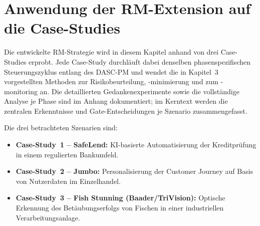 \section{Anwendung der RM-Extension auf die Case-Studies} \label{sec:analyseansatz}

Die entwickelte RM-Strategie wird in diesem Kapitel anhand von drei Case-Studies erprobt.
Jede Case-Study durchläuft dabei denselben phasenspezifischen Steuerungszyklus entlang des DASC-PM
und wendet die in Kapitel~3 vorgestellten Methoden zur Risikobeurteilung,
-minimierung und zum -monitoring an.
Die detaillierten Gedankenexperimente sowie die vollständige Analyse je Phase
sind im Anhang dokumentiert; im Kerntext werden die zentralen Erkenntnisse
und Gate-Entscheidungen je Szenario zusammengefasst.

Die drei betrachteten Szenarien sind:
\begin{itemize}
  \item \textbf{Case-Study~1 – SafeLend:}
        KI-basierte Automatisierung der Kreditprüfung in einem regulierten Bankumfeld.
  \item \textbf{Case-Study~2 – Jumbo:}
        Personalisierung der Customer Journey auf Basis von Nutzerdaten im Einzelhandel.
  \item \textbf{Case-Study~3 – Fish Stunning (Baader/TriVision):}
        Optische Erkennung des Betäubungserfolgs von Fischen in einer industriellen Verarbeitungsanlage.
\end{itemize}
